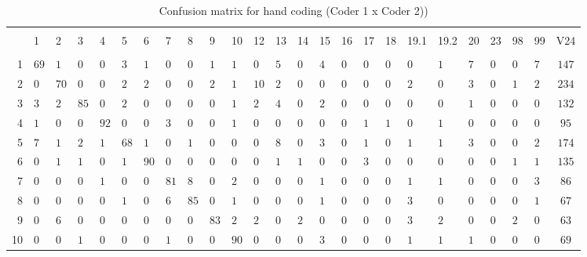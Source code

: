 
\begin{table}[!htbp] \centering 
  \caption{Confusion matrix for hand coding (Coder 1 x Coder 2))} 
  \label{tab:confusion-hand} 
\begin{tabularx}{\textwidth}{r|XXXXXXXXXXXXXXXXXXXXXXXc} 
\\[-1.8ex]\hline 
\hline \\[-1.8ex] 
 & 1 & 2 & 3 & 4 & 5 & 6 & 7 & 8 & 9 & 10 & 12 & 13 & 14 & 15 & 16 & 17 & 18 & 19.1 & 19.2 & 20 & 23 & 98 & 99 & V24 \\ 
\hline \\[-1.8ex] 
1 & $69$ & $1$ & $0$ & $0$ & $3$ & $1$ & $0$ & $0$ & $1$ & $1$ & $0$ & $5$ & $0$ & $4$ & $0$ & $0$ & $0$ & $0$ & $1$ & $7$ & $0$ & $0$ & $7$ & $147$ \\ 
2 & $0$ & $70$ & $0$ & $0$ & $2$ & $2$ & $0$ & $0$ & $2$ & $1$ & $10$ & $2$ & $0$ & $0$ & $0$ & $0$ & $0$ & $2$ & $0$ & $3$ & $0$ & $1$ & $2$ & $234$ \\ 
3 & $3$ & $2$ & $85$ & $0$ & $2$ & $0$ & $0$ & $0$ & $0$ & $1$ & $2$ & $4$ & $0$ & $2$ & $0$ & $0$ & $0$ & $0$ & $0$ & $1$ & $0$ & $0$ & $0$ & $132$ \\ 
4 & $1$ & $0$ & $0$ & $92$ & $0$ & $0$ & $3$ & $0$ & $0$ & $1$ & $0$ & $0$ & $0$ & $0$ & $0$ & $1$ & $1$ & $0$ & $1$ & $0$ & $0$ & $0$ & $0$ & $95$ \\ 
5 & $7$ & $1$ & $2$ & $1$ & $68$ & $1$ & $0$ & $1$ & $0$ & $0$ & $0$ & $8$ & $0$ & $3$ & $0$ & $1$ & $0$ & $1$ & $1$ & $3$ & $0$ & $0$ & $2$ & $174$ \\ 
6 & $0$ & $1$ & $1$ & $0$ & $1$ & $90$ & $0$ & $0$ & $0$ & $0$ & $0$ & $1$ & $1$ & $0$ & $0$ & $3$ & $0$ & $0$ & $0$ & $0$ & $0$ & $1$ & $1$ & $135$ \\ 
7 & $0$ & $0$ & $0$ & $1$ & $0$ & $0$ & $81$ & $8$ & $0$ & $2$ & $0$ & $0$ & $0$ & $1$ & $0$ & $0$ & $0$ & $1$ & $1$ & $0$ & $0$ & $0$ & $3$ & $86$ \\ 
8 & $0$ & $0$ & $0$ & $0$ & $1$ & $0$ & $6$ & $85$ & $0$ & $1$ & $0$ & $0$ & $0$ & $1$ & $0$ & $0$ & $0$ & $3$ & $0$ & $0$ & $0$ & $0$ & $1$ & $67$ \\ 
9 & $0$ & $6$ & $0$ & $0$ & $0$ & $0$ & $0$ & $0$ & $83$ & $2$ & $2$ & $0$ & $2$ & $0$ & $0$ & $0$ & $0$ & $3$ & $2$ & $0$ & $0$ & $2$ & $0$ & $63$ \\ 
10 & $0$ & $0$ & $1$ & $0$ & $0$ & $0$ & $1$ & $0$ & $0$ & $90$ & $0$ & $0$ & $0$ & $3$ & $0$ & $0$ & $0$ & $1$ & $1$ & $1$ & $0$ & $0$ & $0$ & $69$ \\ 

\end{tabularx}
\end{table}

